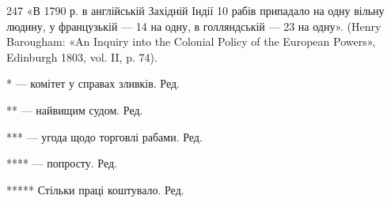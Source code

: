 247 «В 1790 р. в англійській Західній Індії 10 рабів припадало на
одну вільну людину, у французькій — 14 на одну, в голляндській — 23
на одну». (Henry Barougham: «An Inquiry into the Colonial Policy of
the European Powers», Edinburgh 1803, vol. II, p. 74).

* — комітет у справах зливків. Ред.

** — найвищим судом. Ред.

*** — угода щодо торговлі рабами. Ред.

**** — попросту. Ред.

***** Стільки праці коштувало. Ред.
